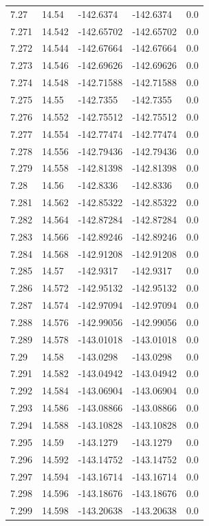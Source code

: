 \begin{tabular}{lllll}
7.27 & 14.54 & -142.6374 & -142.6374 & 0.0 \\
7.271 & 14.542 & -142.65702 & -142.65702 & 0.0 \\
7.272 & 14.544 & -142.67664 & -142.67664 & 0.0 \\
7.273 & 14.546 & -142.69626 & -142.69626 & 0.0 \\
7.274 & 14.548 & -142.71588 & -142.71588 & 0.0 \\
7.275 & 14.55 & -142.7355 & -142.7355 & 0.0 \\
7.276 & 14.552 & -142.75512 & -142.75512 & 0.0 \\
7.277 & 14.554 & -142.77474 & -142.77474 & 0.0 \\
7.278 & 14.556 & -142.79436 & -142.79436 & 0.0 \\
7.279 & 14.558 & -142.81398 & -142.81398 & 0.0 \\
7.28 & 14.56 & -142.8336 & -142.8336 & 0.0 \\
7.281 & 14.562 & -142.85322 & -142.85322 & 0.0 \\
7.282 & 14.564 & -142.87284 & -142.87284 & 0.0 \\
7.283 & 14.566 & -142.89246 & -142.89246 & 0.0 \\
7.284 & 14.568 & -142.91208 & -142.91208 & 0.0 \\
7.285 & 14.57 & -142.9317 & -142.9317 & 0.0 \\
7.286 & 14.572 & -142.95132 & -142.95132 & 0.0 \\
7.287 & 14.574 & -142.97094 & -142.97094 & 0.0 \\
7.288 & 14.576 & -142.99056 & -142.99056 & 0.0 \\
7.289 & 14.578 & -143.01018 & -143.01018 & 0.0 \\
7.29 & 14.58 & -143.0298 & -143.0298 & 0.0 \\
7.291 & 14.582 & -143.04942 & -143.04942 & 0.0 \\
7.292 & 14.584 & -143.06904 & -143.06904 & 0.0 \\
7.293 & 14.586 & -143.08866 & -143.08866 & 0.0 \\
7.294 & 14.588 & -143.10828 & -143.10828 & 0.0 \\
7.295 & 14.59 & -143.1279 & -143.1279 & 0.0 \\
7.296 & 14.592 & -143.14752 & -143.14752 & 0.0 \\
7.297 & 14.594 & -143.16714 & -143.16714 & 0.0 \\
7.298 & 14.596 & -143.18676 & -143.18676 & 0.0 \\
7.299 & 14.598 & -143.20638 & -143.20638 & 0.0 \\

\end{tabular}
